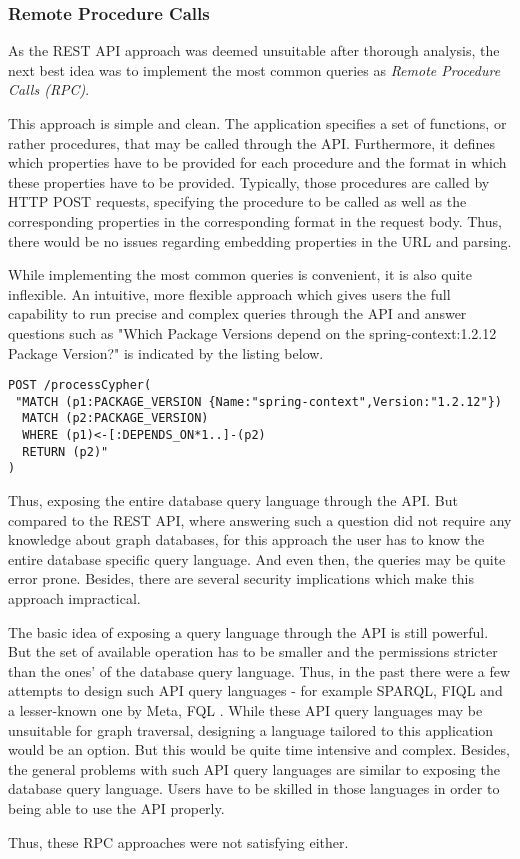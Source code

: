 \subsubsection{Remote Procedure Calls}
As the REST API approach was deemed unsuitable after thorough analysis, the next best idea was to implement the most common queries as \emph{Remote Procedure Calls (RPC)}.\par 
This approach is simple and clean. The application specifies a set of functions, or rather procedures, that may be called through the API. Furthermore, it defines which properties have to be provided for each procedure and the format in which these properties have to be provided. Typically, those procedures are called by HTTP POST requests, specifying the procedure to be called as well as the corresponding properties in the corresponding format in the request body. Thus, there would be no issues regarding embedding properties in the URL and parsing.\par
While implementing the most common queries is convenient, it is also quite inflexible. An intuitive, more flexible approach which gives users the full capability to run precise and complex queries through the API and answer questions such as "Which Package Versions depend on the spring-context:1.2.12 Package Version?" is indicated by the listing below.

\begin{lstlisting}[caption=Exposing Cypher through API, captionpos=b, label=lst:CypherThroughAPI]
POST /processCypher(
 "MATCH (p1:PACKAGE_VERSION {Name:"spring-context",Version:"1.2.12"})
  MATCH (p2:PACKAGE_VERSION)
  WHERE (p1)<-[:DEPENDS_ON*1..]-(p2)
  RETURN (p2)"
)
\end{lstlisting}

Thus, exposing the entire database query language through the API. But compared to the REST API, where answering such a question did not require any knowledge about graph databases, for this approach the user has to know the entire database specific query language. And even then, the queries may be quite error prone. Besides, there are several security implications which make this approach impractical.\par
The basic idea of exposing a query language through the API is still powerful. But the set of available operation has to be smaller and the permissions stricter than the ones' of the database query language. Thus, in the past there were a few attempts to design such API query languages - for example SPARQL, FIQL and a lesser-known one by Meta, FQL \cite{APIYouWontHate}. While these API query languages may be unsuitable for graph traversal, designing a language tailored to this application would be an option. But this would be quite time intensive and complex. Besides, the general problems with such API query languages are similar to exposing the database query language. Users have to be skilled in those languages in order to being able to use the API properly.\par
Thus, these RPC approaches were not satisfying either.

